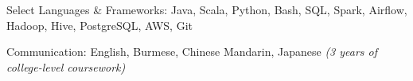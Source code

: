 

\begin{cvskills}

  \cvskill
    {Select Languages \& Frameworks:} %
    {Java, Scala, Python, Bash, SQL, Spark, Airflow, Hadoop, Hive, PostgreSQL, AWS, Git} %

  \cvskill
    {Communication:} %
    {English, Burmese, Chinese Mandarin, Japanese \bodyfontlight\emph{(3 years of college-level coursework)}} %

\end{cvskills}
